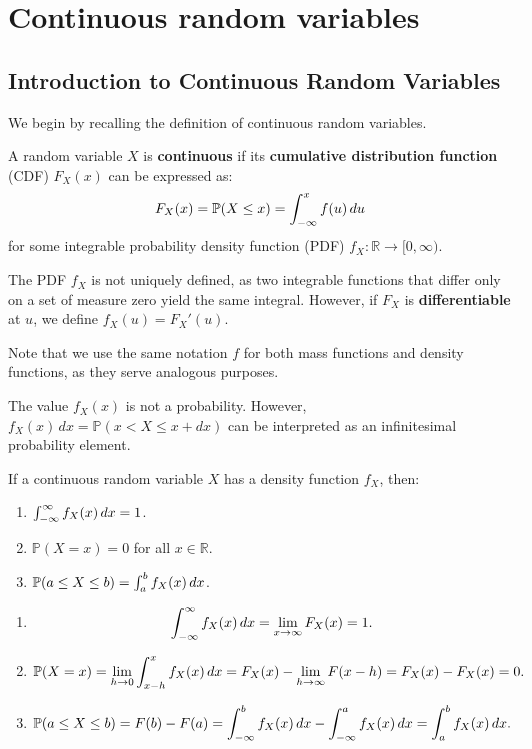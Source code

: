 \documentclass{huhtakm-template-book}
\newcommand{\prob}{\mathbb{P}}
\begin{document}
\chapter{Continuous random variables}
\section{Introduction to Continuous Random Variables}
	We begin by recalling the definition of continuous random variables.
	\begin{defn}
		A random variable $X$ is \textbf{continuous} if its \textbf{cumulative distribution function} (CDF) $F_{X}(x)$ can be expressed as:
		\begin{equation*}
			F_{X}(x)=\prob(X\leq x)=\intlu{-\infty}{x} f(u)\,du
		\end{equation*}
	for some integrable probability density function (PDF) $f_{X}:\mathbb{R}\to[0,\infty)$.
	\end{defn}
	\begin{rem}
		The PDF $f_{X}$ is not uniquely defined, as two integrable functions that differ only on a set of measure zero yield the same integral. However, if $F_{X}$ is \textbf{differentiable} at $u$, we define $f_{X}(u)=F_{X}'(u)$.
	\end{rem}
	Note that we use the same notation $f$ for both mass functions and density functions, as they serve analogous purposes.
	\begin{rem}
		The value $f_{X}(x)$ is not a probability. However, $f_{X}(x)\,dx=\prob(x<X\leq x+dx)$ can be interpreted as an infinitesimal probability element.
	\end{rem}
	\begin{lem}
		\label{properties of density function}
		If a continuous random variable $X$ has a density function $f_{X}$, then:
		\begin{enumerate}
			\item $\int_{-\infty}^{\infty} f_{X}(x)\,dx=1$.
			\item $\prob(X=x)=0$ for all $x\in\mathbb{R}$.
			\item $\prob(a\leq X\leq b)=\intlu{a}{b}f_{X}(x)\,dx$.
		\end{enumerate}
	\end{lem}
	\begin{proofing}
		\begin{enumerate}
			\item 
			\begin{equation*}
				\int_{-\infty}^{\infty} f_{X}(x)\,dx=\lim_{x\to\infty}F_{X}(x)=1.
			\end{equation*}
			\item
			\begin{equation*}
				\prob(X=x)=\lim_{h\to 0}\intlu{x-h}{x}f_{X}(x)\,dx=F_{X}(x)-\lim_{h\to\infty}F(x-h)=F_{X}(x)-F_{X}(x)=0.
			\end{equation*}
			\item
			\begin{equation*}
				\prob(a\leq X\leq b)=F(b)-F(a)=\intlu{-\infty}{b}f_{X}(x)\,dx-\intlu{-\infty}{a} f_{X}(x)\,dx=\intlu{a}{b}f_{X}(x)\,dx.
			\end{equation*}
		\end{enumerate}
	\end{proofing}
\end{document}
